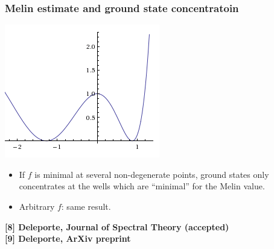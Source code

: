 \documentclass[mathserif]{beamer}
\begin{document}
\begin{frame}
  \frametitle{Melin estimate and ground state concentratoin}
  \begin{minipage}[l]{0.3\linewidth}\vspace{1em}
    \includegraphics[width=\linewidth]{wells.png}\\
  \end{minipage}
  \begin{minipage}[r]{0.65\linewidth}
    \begin{itemize}
    \item If $f$ is minimal at several non-degenerate points, ground
      states only concentrates at the wells which are ``minimal'' for
      the Melin value.\vspace{1em}
    \item<2-> Arbitrary $f$: same result. 
    \end{itemize}
  \end{minipage}

  \vspace{1.7em}

\footnotesize{{\bfseries [8] Deleporte, Journal of Spectral Theory
    (accepted)}\\{\bfseries [9] Deleporte, ArXiv preprint}}
\end{frame}
\end{document}

